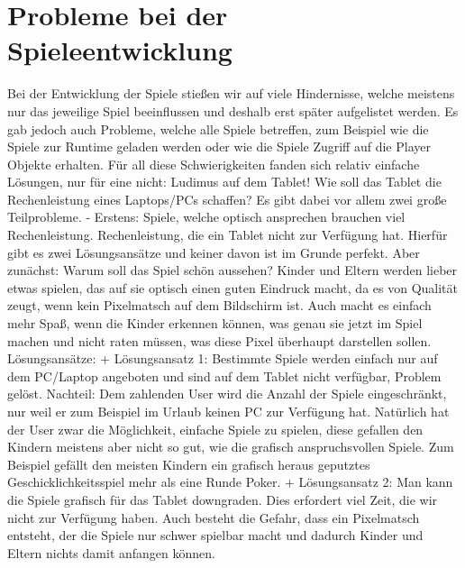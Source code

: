 \section{Probleme bei der Spieleentwicklung}
Bei der Entwicklung der Spiele stießen wir auf viele Hindernisse, welche meistens nur das jeweilige Spiel beeinflussen und deshalb erst später aufgelistet werden. Es gab jedoch auch Probleme, welche alle Spiele betreffen, zum Beispiel wie die Spiele zur Runtime geladen werden oder wie die Spiele Zugriff auf die Player Objekte erhalten. Für all diese Schwierigkeiten fanden sich relativ einfache Lösungen, nur für eine nicht: Ludimus auf dem Tablet! Wie soll das Tablet die Rechenleistung eines Laptops/PCs schaffen? Es gibt dabei vor allem zwei große Teilprobleme.
\newline \newline \tab 
- Erstens: Spiele, welche optisch ansprechen brauchen viel Rechenleistung. Rechenleistung, die ein Tablet nicht zur Verfügung hat. Hierfür gibt es zwei Lösungsansätze und keiner davon ist im Grunde perfekt. Aber zunächst: Warum soll das Spiel schön aussehen? Kinder und Eltern werden lieber etwas spielen, das auf sie optisch einen guten Eindruck macht, da es von Qualität zeugt, wenn kein Pixelmatsch auf dem Bildschirm ist. Auch macht es einfach mehr Spaß, wenn die Kinder erkennen können, was genau sie jetzt im Spiel machen und nicht raten müssen, was diese Pixel überhaupt darstellen sollen. Lösungsansätze:
\newline \newline \tab \tab 
+ Lösungsansatz 1: Bestimmte Spiele werden einfach nur auf dem PC/Laptop angeboten und sind auf dem Tablet nicht verfügbar, Problem gelöst. Nachteil: Dem zahlenden User wird die Anzahl der Spiele eingeschränkt, nur weil er zum Beispiel im Urlaub keinen PC zur Verfügung hat. Natürlich hat der User zwar die Möglichkeit, einfache Spiele zu spielen, diese gefallen den Kindern meistens aber nicht so gut, wie die grafisch anspruchsvollen Spiele. Zum Beispiel gefällt den meisten Kindern ein grafisch heraus geputztes Geschicklichkeitsspiel mehr als eine Runde Poker.
\newline \newline \tab \tab 
+ Lösungsansatz 2: Man kann die Spiele grafisch für das Tablet downgraden. Dies erfordert viel Zeit, die wir nicht zur Verfügung haben. Auch besteht die Gefahr, dass ein Pixelmatsch entsteht, der die Spiele nur schwer spielbar macht und dadurch Kinder und Eltern nichts damit anfangen können.
\newline \newline \tab
